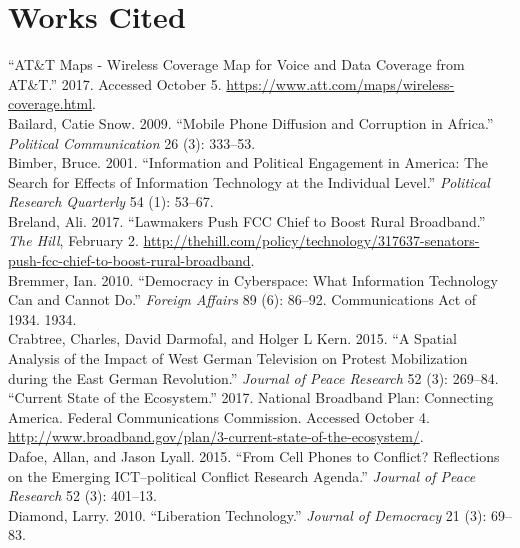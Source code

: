 \documentclass[12pt]{article}
\begin{document}
	\section{Works Cited}
	\hspace*{-1cm}“AT\&T Maps - Wireless Coverage Map for Voice and Data Coverage from AT\&T.” 2017. Accessed October 5. \url{https://www.att.com/maps/wireless-coverage.html}.\\
	\hspace*{-1cm}Bailard, Catie Snow. 2009. “Mobile Phone Diffusion and Corruption in Africa.” \textit{Political Communication} 26 (3): 333--53.\\
	\hspace*{-1cm}Bimber, Bruce. 2001. “Information and Political Engagement in America: The Search for Effects of Information Technology at the Individual Level.” \textit{Political Research Quarterly} 54 (1): 53--67.\\
	\hspace*{-1cm}Breland, Ali. 2017. “Lawmakers Push FCC Chief to Boost Rural Broadband.” \textit{The Hill}, February 2. \url{http://thehill.com/policy/technology/317637-senators-push-fcc-chief-to-boost-rural-broadband}.\\
	\hspace*{-1cm}Bremmer, Ian. 2010. “Democracy in Cyberspace: What Information Technology Can and Cannot Do.” \textit{Foreign Affairs} 89 (6): 86--92.
	Communications Act of 1934. 1934.\\
	\hspace*{-1cm}Crabtree, Charles, David Darmofal, and Holger L Kern. 2015. “A Spatial Analysis of the Impact of West German Television on Protest Mobilization during the East German Revolution.” \textit{Journal of Peace Research }52 (3): 269--84.\\
	\hspace*{-1cm}“Current State of the Ecosystem.” 2017. National Broadband Plan: Connecting America. Federal Communications Commission. Accessed October 4. \url{http://www.broadband.gov/plan/3-current-state-of-the-ecosystem/}.\\
	\hspace*{-1cm}Dafoe, Allan, and Jason Lyall. 2015. “From Cell Phones to Conflict? Reflections on the Emerging ICT--political Conflict Research Agenda.” \textit{Journal of Peace Research} 52 (3): 401--13. \\
	\hspace*{-1cm}Diamond, Larry. 2010. “Liberation Technology.” \textit{Journal of Democracy} 21 (3): 69--83.\\
\end{document}
